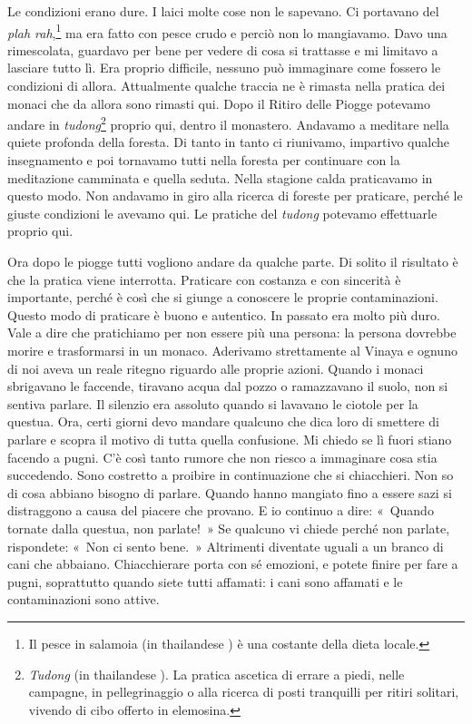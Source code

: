 Le condizioni erano dure. I laici molte cose non le sapevano. Ci
portavano del \emph{plah rah},\footnote{Il pesce in salamoia (in
  thailandese )
  è una costante della dieta locale.} ma era fatto con pesce crudo e
perciò non lo mangiavamo. Davo una rimescolata, guardavo per bene per
vedere di cosa si trattasse e mi limitavo a lasciare tutto lì. Era
proprio difficile, nessuno può immaginare come fossero le condizioni di
allora. Attualmente qualche traccia ne è rimasta nella pratica dei
monaci che da allora sono rimasti qui. Dopo il Ritiro delle Piogge
potevamo andare in \emph{tudong}\footnote{\emph{Tudong} (in thailandese
  ). La pratica ascetica di errare a piedi, nelle campagne, in
  pellegrinaggio o alla ricerca di posti tranquilli per ritiri solitari,
  vivendo di cibo offerto in elemosina.} proprio qui, dentro il
monastero. Andavamo a meditare nella quiete profonda della foresta. Di
tanto in tanto ci riunivamo, impartivo qualche insegnamento e poi
tornavamo tutti nella foresta per continuare con la meditazione
camminata e quella seduta. Nella stagione calda praticavamo in questo
modo. Non andavamo in giro alla ricerca di foreste per praticare, perché
le giuste condizioni le avevamo qui. Le pratiche del \emph{tudong}
potevamo effettuarle proprio qui.

Ora dopo le piogge tutti vogliono andare da qualche parte. Di solito il
risultato è che la pratica viene interrotta. Praticare con costanza e
con sincerità è importante, perché è così che si giunge a conoscere le
proprie contaminazioni. Questo modo di praticare è buono e autentico. In
passato era molto più duro. Vale a dire che pratichiamo per non essere
più una persona: la persona dovrebbe morire e trasformarsi in un monaco.
Aderivamo strettamente al Vinaya e ognuno di noi aveva un reale ritegno
riguardo alle proprie azioni. Quando i monaci sbrigavano le faccende,
tiravano acqua dal pozzo o ramazzavano il suolo, non si sentiva parlare.
Il silenzio era assoluto quando si lavavano le ciotole per la questua.
Ora, certi giorni devo mandare qualcuno che dica loro di smettere di
parlare e scopra il motivo di tutta quella confusione. Mi chiedo se lì
fuori stiano facendo a pugni. C'è così tanto rumore che non riesco a
immaginare cosa stia succedendo. Sono costretto a proibire in
continuazione che si chiacchieri. Non so di cosa abbiano bisogno di
parlare. Quando hanno mangiato fino a essere sazi si distraggono a causa
del piacere che provano. E io continuo a dire: «~Quando tornate dalla
questua, non parlate!~» Se qualcuno vi chiede perché non parlate,
rispondete: «~Non ci sento bene.~» Altrimenti diventate uguali a un
branco di cani che abbaiano. Chiacchierare porta con sé emozioni, e
potete finire per fare a pugni, soprattutto quando siete tutti affamati:
i cani sono affamati e le contaminazioni sono attive.

